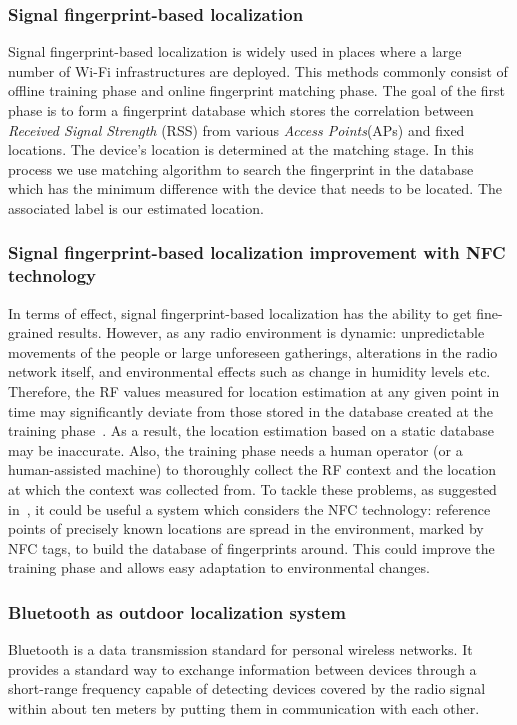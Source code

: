 \subsubsection{Signal fingerprint-based localization}
Signal fingerprint-based localization is widely used in places where a large number of Wi-Fi infrastructures are deployed.
This methods commonly consist of offline training phase and online fingerprint matching phase.
The goal of the first phase is to form a fingerprint database which stores the correlation between \textit{Received Signal Strength} (RSS) from
various \textit{Access Points}(APs) and fixed locations.
The device's location is determined at the matching stage.
In this process we use matching algorithm to search the fingerprint
in the database which has the minimum difference with the device that needs to be located.
The associated label is our estimated location.

\subsubsection{Signal fingerprint-based localization improvement with NFC technology}
In terms of effect, signal fingerprint-based localization has the ability to get fine-grained results.
However, as any radio environment is dynamic: unpredictable movements of the people or large unforeseen gatherings,
alterations in the radio network itself, and environmental effects such as change in humidity levels etc.~\cite{chaudhry2013indoor}
Therefore, the RF values measured for location estimation at any given point in time may significantly deviate from
those stored in the database created at the training phase~\cite{chaudhry2013indoor}.
As a result, the location estimation based on a static database may be inaccurate.
Also, the training phase needs a human operator (or a human-assisted machine) to thoroughly collect the RF context and
the location at which the context was collected from.
To tackle these problems, as suggested in~\cite{chaudhry2013indoor}, it could be useful a system which considers the NFC technology:
reference points of precisely known locations are spread in the environment, marked by NFC tags, to build the database of fingerprints around.
This could improve the training phase and allows easy adaptation to environmental changes.

\subsubsection{Bluetooth as outdoor localization system}
Bluetooth is a data transmission standard for personal wireless networks. It provides a standard way to exchange information between
devices through a short-range frequency capable of detecting devices covered by the radio signal within about ten meters by putting them
in communication with each other.

